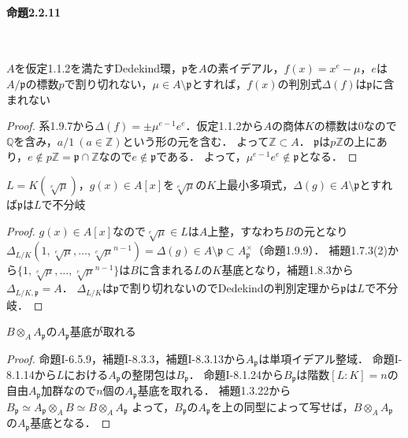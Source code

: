 \paragraph{命題2.2.11}~
\begin{screen}
  $A$を仮定1.1.2を満たすDedekind環，$\mathfrak{p}$を$A$の素イデアル，$f(x)=x^e-\mu$，$e$は$A/\mathfrak{p}$の標数$p$で割り切れない，$\mu\in A\setminus\mathfrak{p}$とすれば，$f(x)$の判別式$\varDelta(f)$は$\mathfrak{p}$に含まれない
\end{screen}
\begin{proof}
  系1.9.7から$\varDelta(f)=\pm\mu^{e-1}e^e$．仮定1.1.2から$A$の商体$K$の標数は$0$なので$\mathbb{Q}$を含み，$a/1\ (a\in\mathbb{Z})$という形の元を含む．
  よって$\mathbb{Z}\subset A$．
  $\mathfrak{p}$は$p\mathbb{Z}$の上にあり，$e \not\in p\mathbb{Z} = \mathfrak{p} \cap \mathbb{Z}$なので$e\not\in\mathfrak{p}$である．
  よって，$\mu^{e-1}e^e\not\in\mathfrak{p}$となる．
\end{proof}

\begin{screen}
  $L=K(\sqrt[e]{\mu})$，$g(x)\in A[x]$を$\sqrt[e]{\mu}$の$K$上最小多項式，$\varDelta(g)\in A\setminus\mathfrak{p}$とすれば$\mathfrak{p}$は$L$で不分岐
\end{screen}
\begin{proof}
  $g(x)\in A[x]$なので$\sqrt[e]{\mu}\in L$は$A$上整，すなわち$B$の元となり$\varDelta_{L/K}(1, \sqrt[e]{\mu}, \ldots, \sqrt[e]{\mu}^{n-1})=\varDelta(g)\in A\setminus\mathfrak{p}\subset A_\mathfrak{p}^\times$（命題1.9.9）．
  補題1.7.3(2)から$\{ 1, \sqrt[e]{\mu}, \ldots, \sqrt[e]{\mu}^{n-1} \}$は$B$に含まれる$L$の$K$基底となり，補題1.8.3から$\varDelta_{L/K, \mathfrak{p}}=A$．
  $\varDelta_{L/K}$は$\mathfrak{p}$で割り切れないのでDedekindの判別定理から$\mathfrak{p}$は$L$で不分岐．
\end{proof}

\begin{screen}
  $B\otimes_AA_\mathfrak{p}$の$A_\mathfrak{p}$基底が取れる
\end{screen}
\begin{proof}
  命題I-6.5.9，補題I-8.3.3，補題I-8.3.13から$A_\mathfrak{p}$は単項イデアル整域．
  命題I-8.1.14から$L$における$A_\mathfrak{p}$の整閉包は$B_\mathfrak{p}$．
  命題I-8.1.24から$B_\mathfrak{p}$は階数$[L:K]=n$の自由$A_\mathfrak{p}$加群なので$n$個の$A_\mathfrak{p}$基底を取れる．
  補題1.3.22から$B_\mathfrak{p}\simeq A_\mathfrak{p}\otimes_AB\simeq B\otimes_AA_\mathfrak{p}$
  よって，$B_\mathfrak{p}$の$A_\mathfrak{p}$を上の同型によって写せば，$B\otimes_AA_\mathfrak{p}$の$A_\mathfrak{p}$基底となる．
\end{proof}

